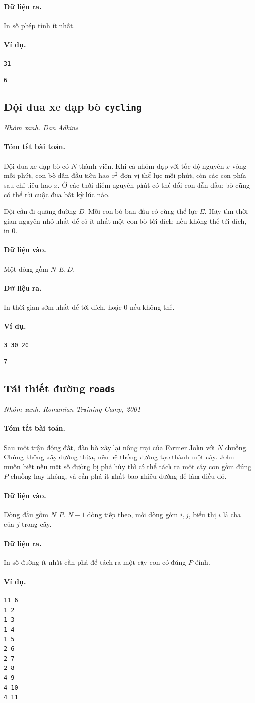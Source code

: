 \documentclass[11pt]{article}
\newcommand{\problem}[4]{%
  \subsection[#1 (#2)]{#1 \hfill {\normalsize\texttt{#2}}}%
  \noindent\textit{#3. #4}\par\smallskip
}
\newcommand{\iosec}[1]{\paragraph{#1}}
\begin{document}
\iosec{Dữ liệu ra.}
In số phép tính ít nhất.

\iosec{Ví dụ.}
\begin{verbatim}
31
\end{verbatim}

\begin{verbatim}
6
\end{verbatim}

\problem{Đội đua xe đạp bò}{cycling}{Nhóm xanh}{Dan Adkins}

\iosec{Tóm tắt bài toán.}
Đội đua xe đạp bò có \(N\) thành viên. Khi cả nhóm đạp với tốc độ nguyên
\(x\) vòng mỗi phút, con bò dẫn đầu tiêu hao \(x^2\) đơn vị thể lực mỗi phút,
còn các con phía sau chỉ tiêu hao \(x\). Ở các thời điểm nguyên phút có thể
đổi con dẫn đầu; bò cũng có thể rời cuộc đua bất kỳ lúc nào.

Đội cần đi quãng đường \(D\). Mỗi con bò ban đầu có cùng thể lực \(E\). Hãy
tìm thời gian nguyên nhỏ nhất để có ít nhất một con bò tới đích; nếu không thể
tới đích, in \(0\).

\iosec{Dữ liệu vào.}
Một dòng gồm \(N,E,D\).

\iosec{Dữ liệu ra.}
In thời gian sớm nhất để tới đích, hoặc \(0\) nếu không thể.

\iosec{Ví dụ.}
\begin{verbatim}
3 30 20
\end{verbatim}

\begin{verbatim}
7
\end{verbatim}

\problem{Tái thiết đường}{roads}{Nhóm xanh}{Romanian Training Camp, 2001}

\iosec{Tóm tắt bài toán.}
Sau một trận động đất, đàn bò xây lại nông trại của Farmer John với \(N\)
chuồng. Chúng không xây đường thừa, nên hệ thống đường tạo thành một cây. John
muốn biết nếu một số đường bị phá hủy thì có thể tách ra một cây con gồm đúng
\(P\) chuồng hay không, và cần phá ít nhất bao nhiêu đường để làm điều đó.

\iosec{Dữ liệu vào.}
Dòng đầu gồm \(N,P\). \(N-1\) dòng tiếp theo, mỗi dòng gồm \(i,j\), biểu thị
\(i\) là cha của \(j\) trong cây.

\iosec{Dữ liệu ra.}
In số đường ít nhất cần phá để tách ra một cây con có đúng \(P\) đỉnh.

\iosec{Ví dụ.}
\begin{verbatim}
11 6
1 2
1 3
1 4
1 5
2 6
2 7
2 8
4 9
4 10
4 11
\end{verbatim}
\end{document}
